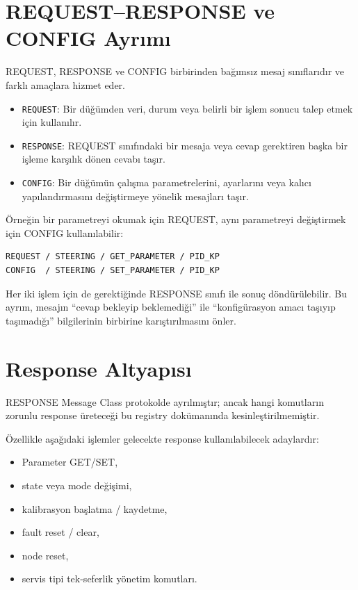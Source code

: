 \documentclass[a4paper,10pt]{article}
\newcommand{\code}[1]{\texttt{#1}}
\begin{document}
\section{REQUEST--RESPONSE ve CONFIG Ayrımı}

REQUEST, RESPONSE ve CONFIG birbirinden bağımsız mesaj sınıflarıdır ve farklı amaçlara hizmet eder.

\begin{itemize}
    \item \code{REQUEST}: Bir düğümden veri, durum veya belirli bir işlem sonucu talep etmek için kullanılır.
    \item \code{RESPONSE}: REQUEST sınıfındaki bir mesaja veya cevap gerektiren başka bir işleme karşılık dönen cevabı taşır.
    \item \code{CONFIG}: Bir düğümün çalışma parametrelerini, ayarlarını veya kalıcı yapılandırmasını değiştirmeye yönelik mesajları taşır.
\end{itemize}

Örneğin bir parametreyi okumak için REQUEST, aynı parametreyi değiştirmek için CONFIG
kullanılabilir:

\begin{verbatim}
REQUEST / STEERING / GET_PARAMETER / PID_KP
CONFIG  / STEERING / SET_PARAMETER / PID_KP
\end{verbatim}

Her iki işlem için de gerektiğinde RESPONSE sınıfı ile sonuç döndürülebilir. Bu ayrım,
mesajın ``cevap bekleyip beklemediği'' ile ``konfigürasyon amacı taşıyıp taşımadığı''
bilgilerinin birbirine karıştırılmasını önler.

\section{Response Altyapısı}

RESPONSE Message Class protokolde ayrılmıştır; ancak hangi komutların zorunlu response
üreteceği bu registry dokümanında kesinleştirilmemiştir.

Özellikle aşağıdaki işlemler gelecekte response kullanılabilecek adaylardır:
\begin{itemize}
    \item Parameter GET/SET,
    \item state veya mode değişimi,
    \item kalibrasyon başlatma / kaydetme,
    \item fault reset / clear,
    \item node reset,
    \item servis tipi tek-seferlik yönetim komutları.
\end{itemize}
\end{document}
